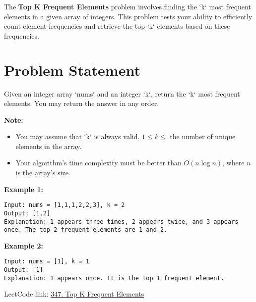 
\label{problem:top_k_frequent_elements}

The \textbf{Top K Frequent Elements} problem involves finding the `k` most frequent elements in a given array of integers. This problem tests your ability to efficiently count element frequencies and retrieve the top `k` elements based on these frequencies.

\section*{Problem Statement}
Given an integer array `nums` and an integer `k`, return the `k` most frequent elements. You may return the answer in any order.

\textbf{Note:} 
\begin{itemize}
    \item You may assume that `k` is always valid, \(1 \leq k \leq\) the number of unique elements in the array.
    \item Your algorithm's time complexity must be better than \(O(n \log n)\), where \(n\) is the array's size.
\end{itemize}

\textbf{Example 1:}

\begin{verbatim}
Input: nums = [1,1,1,2,2,3], k = 2
Output: [1,2]
Explanation: 1 appears three times, 2 appears twice, and 3 appears once. The top 2 frequent elements are 1 and 2.
\end{verbatim}

\textbf{Example 2:}

\begin{verbatim}
Input: nums = [1], k = 1
Output: [1]
Explanation: 1 appears once. It is the top 1 frequent element.
\end{verbatim}

LeetCode link: \href{https://leetcode.com/problems/top-k-frequent-elements/}{347. Top K Frequent Elements}



